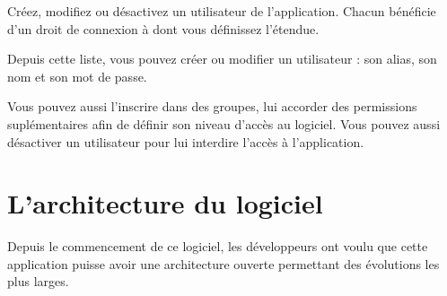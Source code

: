 \documentclass[a4paper,10pt,oneside,french]{sphinxmanual}
\begin{document}
\sphinxAtStartPar
Créez, modifiez ou désactivez un utilisateur de l’application. Chacun bénéficie d’un droit de connexion à  dont vous définissez l’étendue.

\noindent{}

\sphinxAtStartPar
Depuis cette liste, vous pouvez créer ou modifier un utilisateur : son alias, son nom et son mot de passe.

\noindent{}

\sphinxAtStartPar
Vous pouvez aussi l’inscrire dans des groupes, lui accorder des permissions suplémentaires afin de définir son niveau d’accès au logiciel. Vous pouvez aussi désactiver un utilisateur pour lui interdire l’accès à l’application.

\noindent{}

\sphinxstepscope


\section{L’architecture du logiciel}
\label{\detokenize{CORE/architecture:l-architecture-du-logiciel}}\label{\detokenize{CORE/architecture::doc}}
\sphinxAtStartPar
Depuis le commencement de ce logiciel, les développeurs ont voulu que cette application puisse avoir une architecture ouverte permettant des évolutions les plus larges.



\renewcommand{\indexname}{Index}
\printindex
\end{document}
